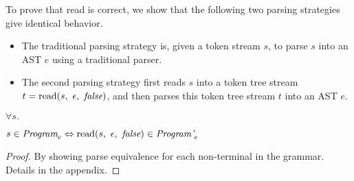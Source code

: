 \documentclass[preprint,10pt]{sigplanconf}
\begin{document}
To prove that read is correct, we show that the following two parsing
strategies give identical behavior.
\begin{itemize}
\item The traditional parsing strategy is, given a token stream \( s
  \), to parse \( s \) into an AST \( e \) using a traditional parser.

\item The second parsing strategy first reads \( s \) into a token
  tree stream \( t = \textrm{read}(s,~\epsilon,~\textit{false}) \), and then parses
  this token tree stream \( t \) into an AST \( e \).
\end{itemize}

\begin{theorem}\mbox{}

  \( \forall s. \)

  \( s \in \textit{Program}_{e} \Leftrightarrow 
  \textrm{read}(s,~\epsilon,~\textit{false}) \in \textit{Program'}_{e} \)

\end{theorem}
\begin{proof}\mbox{}
  By showing parse equivalence for each non-terminal in the grammar.
  Details in the appendix.
\end{proof}
\end{document}
